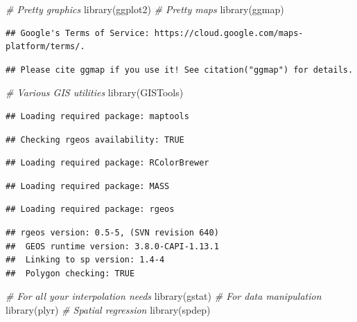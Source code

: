 \documentclass[
]{book}
\newenvironment{Shaded}{\begin{snugshade}}{\end{snugshade}}
\newcommand{\CommentTok}[1]{\textcolor[rgb]{0.56,0.35,0.01}{\textit{#1}}}
\newcommand{\FunctionTok}[1]{\textcolor[rgb]{0.00,0.00,0.00}{#1}}
\newcommand{\NormalTok}[1]{#1}
\begin{document}
\begin{Shaded}
\begin{Highlighting}[]
\CommentTok{\# Pretty graphics}
\FunctionTok{library}\NormalTok{(ggplot2)}
\CommentTok{\# Pretty maps}
\FunctionTok{library}\NormalTok{(ggmap)}
\end{Highlighting}
\end{Shaded}

\begin{verbatim}
## Google's Terms of Service: https://cloud.google.com/maps-platform/terms/.
\end{verbatim}

\begin{verbatim}
## Please cite ggmap if you use it! See citation("ggmap") for details.
\end{verbatim}

\begin{Shaded}
\begin{Highlighting}[]
\CommentTok{\# Various GIS utilities}
\FunctionTok{library}\NormalTok{(GISTools)}
\end{Highlighting}
\end{Shaded}

\begin{verbatim}
## Loading required package: maptools
\end{verbatim}

\begin{verbatim}
## Checking rgeos availability: TRUE
\end{verbatim}

\begin{verbatim}
## Loading required package: RColorBrewer
\end{verbatim}

\begin{verbatim}
## Loading required package: MASS
\end{verbatim}

\begin{verbatim}
## Loading required package: rgeos
\end{verbatim}

\begin{verbatim}
## rgeos version: 0.5-5, (SVN revision 640)
##  GEOS runtime version: 3.8.0-CAPI-1.13.1 
##  Linking to sp version: 1.4-4 
##  Polygon checking: TRUE
\end{verbatim}

\begin{Shaded}
\begin{Highlighting}[]
\CommentTok{\# For all your interpolation needs}
\FunctionTok{library}\NormalTok{(gstat)}
\CommentTok{\# For data manipulation}
\FunctionTok{library}\NormalTok{(plyr)}
\CommentTok{\# Spatial regression}
\FunctionTok{library}\NormalTok{(spdep)}
\end{Highlighting}
\end{Shaded}
\end{document}
